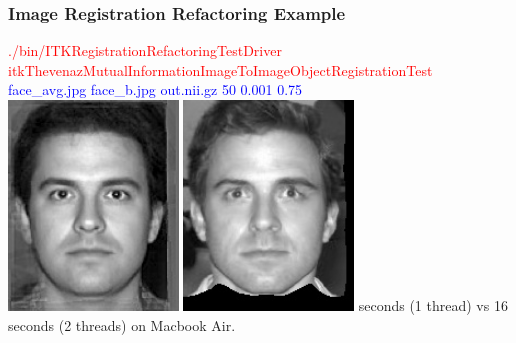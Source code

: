 \begin{frame}
\frametitle{Image Registration Refactoring Example}
\textcolor{red}{./bin/ITKRegistrationRefactoringTestDriver itkThevenazMutualInformationImageToImageObjectRegistrationTest }\\
\textcolor{blue}{face\_avg.jpg face\_b.jpg out.nii.gz  50 0.001 0.75 }\\
\includegraphics[height=2.2in]{../Art/face_avg.jpg}
\includegraphics[height=2.2in]{../Art/face_b_to_face_avg.jpg}
 seconds (1 thread) vs 16 seconds (2 threads) on Macbook Air.
\end{frame}

